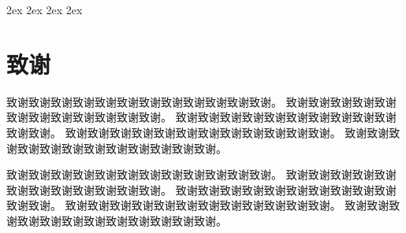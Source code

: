 \documentclass[a4paper,UTF8,twoside,zihao=-4,no-math,linespread=1.65,AutoFakeBold=1.8,AutoFakeSlant=true]{ctexrep}
\renewcommand{\headrulewidth}{0pt}
\begin{document}
\songti			                 %
\abovedisplayskip 2ex			 %
\belowdisplayskip 2ex
\abovedisplayshortskip 2ex
\belowdisplayshortskip 2ex

\begin{titlepage}
\end{titlepage}

\pagestyle{plain}				 %
\clearpage

\begin{center}
	\tableofcontents             %
\end{center}

\clearpage
\fancyhf{}\renewcommand*{\headrulewidth}{0.75bp}
\fancyhead[L]{}
\fancyhead[R]{}
\fancyhead[CE]{\small \leftmark}					  %
\fancyfoot[C]{\thepage}								  %
\pagestyle{fancy}		                              %




%
%

\renewcommand*{\bibfont}{\small}
\printbibliography[heading=bibintoc]                  %

\chapter*{致谢}
致谢致谢致谢致谢致谢致谢致谢致谢致谢致谢致谢致谢。
致谢致谢致谢致谢致谢致谢致谢致谢致谢致谢致谢致谢。
致谢致谢致谢致谢致谢致谢致谢致谢致谢致谢致谢致谢。
致谢致谢致谢致谢致谢致谢致谢致谢致谢致谢致谢致谢。
致谢致谢致谢致谢致谢致谢致谢致谢致谢致谢致谢致谢。

致谢致谢致谢致谢致谢致谢致谢致谢致谢致谢致谢致谢。
致谢致谢致谢致谢致谢致谢致谢致谢致谢致谢致谢致谢。
致谢致谢致谢致谢致谢致谢致谢致谢致谢致谢致谢致谢。
致谢致谢致谢致谢致谢致谢致谢致谢致谢致谢致谢致谢。
致谢致谢致谢致谢致谢致谢致谢致谢致谢致谢致谢致谢。

\appendix					    %
\end{document}
